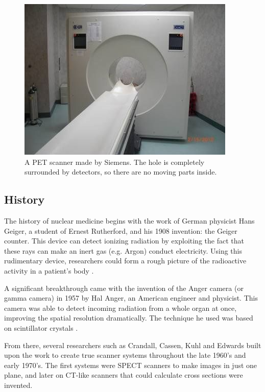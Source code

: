 \begin{figure}[ht]
\begin{center}
  \includegraphics[width=\linewidth]{img/petscanner.jpg}
  \caption{A PET scanner made by Siemens. The hole is completely surrounded by
  detectors, so there are no moving parts inside.}
  \label{fig:petscanner}
\end{center}
\end{figure}

\subsection{History}
The history of nuclear medicine begins with the work of German physicist Hans
Geiger, a student of Ernest Rutherford, and his 1908 invention: the Geiger
counter. This device can detect ionizing radiation by exploiting the fact that
these rays can make an inert gas (e.g. Argon) conduct electricity. Using
this rudimentary device, researchers could form a rough picture of the radioactive
activity in a patient's body \cite{specthistory, geigercountertube}.

A significant breakthrough came with the invention of the Anger camera (or
gamma camera) in 1957 by Hal Anger, an American engineer and physicist. This
camera was able to detect incoming radiation from a whole organ at once,
improving the spatial resolution dramatically. The technique he used was based
on scintillator crystals \cite{anger}.

From there, several researchers such as Crandall, Cassen, Kuhl and Edwards built
upon the work to create true scanner systems throughout the late 1960's and
early 1970's. The first systems were SPECT scanners to make images in just one
plane, and later on CT-like scanners that could calculate cross sections were
invented.

